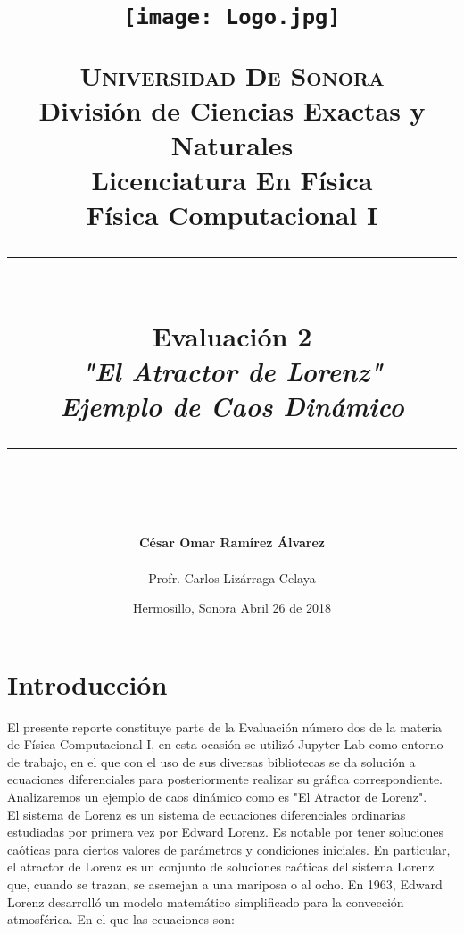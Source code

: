 \documentclass[12pt]{article}
\newcommand{\HRule}[1]{\rule{\linewidth}{#1}}
\begin{document}
\begin{titlepage}

\title{ \normalsize 
        \begin{center}
        \texttt{[image: Logo.jpg]}
        \end{center}
        \LARGE \textsc{\textbf{Universidad De Sonora}} \\ \bigskip
		\Large División de Ciencias Exactas y Naturales \\
        Licenciatura En Física \\ \bigskip
        \bigskip
        Física Computacional I
		\\ [0.1cm]  
		\HRule{2pt} \\
		\Large \textbf{{Evaluación 2}} \\
        \textit{\textbf{"El Atractor de Lorenz"\\ Ejemplo de Caos Dinámico}}
		\HRule{2pt} \\
		\normalsize \vspace*{0.001\baselineskip}}
        
\date{\bigskip \Large Hermosillo, Sonora  \hspace*{\fill}  Abril 26 de 2018}

        
\author{
		\Large\textbf{ César Omar Ramírez Álvarez} \\ \bigskip
        \\ \bigskip
       \Large Profr. Carlos Lizárraga Celaya}
       \end{titlepage}
       \maketitle
       
\newpage
\pagestyle{plain}
\section*{Introducción}
 El presente reporte constituye parte de la Evaluación número dos de la materia de Física Computacional I, en esta ocasión se utilizó Jupyter Lab como entorno de trabajo, en el que con el uso de sus diversas bibliotecas se da solución a ecuaciones diferenciales para posteriormente realizar su gráfica correspondiente. Analizaremos un ejemplo de caos dinámico como es "El Atractor de Lorenz".\\
 
El sistema de Lorenz es un sistema de ecuaciones diferenciales ordinarias estudiadas por primera vez por Edward Lorenz. Es notable por tener soluciones caóticas para ciertos valores de parámetros y condiciones iniciales. En particular, el atractor de Lorenz es un conjunto de soluciones caóticas del sistema Lorenz que, cuando se trazan, se asemejan a una mariposa o al ocho. En 1963, Edward Lorenz desarrolló un modelo matemático simplificado para la convección atmosférica. En el que las ecuaciones son:\\
\end{document}
